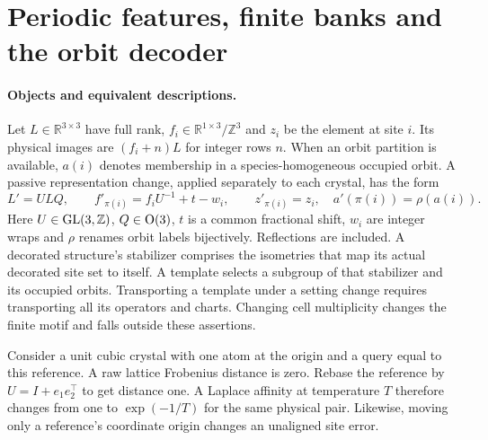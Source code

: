 \section{Periodic features, finite banks and the orbit decoder}\label{app:periodic-field}

\paragraph{Objects and equivalent descriptions.}
Let \(L\in{\mathbb R}^{3\times3}\) have full rank, \(f_i\in{\mathbb R}^{1\times3}/{\mathbb Z}^3\)
and \(z_i\) be the element at site \(i\). Its physical images are \((f_i+n)L\) for integer rows \(n\).
When an orbit partition is available, \(a(i)\) denotes membership in a species-homogeneous occupied orbit.
A passive representation change, applied separately to each crystal, has the form
\[
 L'=ULQ,\qquad f'_{\pi(i)}=f_iU^{-1}+t-w_i,\qquad
 z'_{\pi(i)}=z_i,\quad a'(\pi(i))=\rho(a(i)).
\]
Here \(U\in{\rm GL}(3,{\mathbb Z})\), \(Q\in{\rm O}(3)\), \(t\) is a common fractional shift,
\(w_i\) are integer wraps and \(\rho\) renames orbit labels bijectively. Reflections are included.
A decorated structure's stabilizer comprises the isometries that map its actual decorated site set to itself.
A template selects a subgroup of that stabilizer and its occupied orbits. Transporting a template under
a setting change requires transporting all its operators and charts. Changing cell multiplicity
changes the finite motif and falls outside these assertions.

Consider a unit cubic crystal with one atom at the origin and a query equal to this reference. A raw
lattice Frobenius distance is zero. Rebase the reference by \(U=I+e_1e_2^\top\) to get distance one.
A Laplace affinity at temperature \(T\) therefore changes from one to \(\exp(-1/T)\) for the same
physical pair. Likewise, moving only a reference's coordinate origin changes an unaligned site error.

